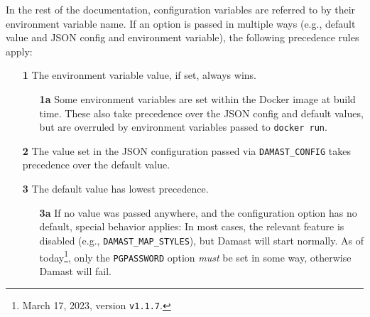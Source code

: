 In the rest of the documentation, configuration variables are referred to by their environment variable name.
If an option is passed in multiple ways (e.g., default value and JSON config and environment variable), the following precedence rules apply:

\begin{itemize}
  \item[\bfseries 1] The environment variable value, if set, always wins.
    \begin{itemize}
      \item[\bfseries 1a] Some environment variables are set within the Docker image at build time.
        These also take precedence over the JSON config and default values, but are overruled by environment variables passed to \verb!docker run!.
        \end{itemize}
  \item[\bfseries 2] The value set in the JSON configuration passed via \verb!DAMAST_CONFIG! takes precedence over the default value.
  \item[\bfseries 3] The default value has lowest precedence.
    \begin{itemize}
      \item[\bfseries 3a] If no value was passed anywhere, and the configuration option has no default, special behavior applies:
        In most cases, the relevant feature is disabled (e.g., \verb!DAMAST_MAP_STYLES!), but Damast will start normally.
        As of today\footnote{March 17, 2023, version \texttt{v1.1.7}.}, only the \verb!PGPASSWORD! option \emph{must} be set in some way, otherwise Damast will fail.
    \end{itemize}
\end{itemize}


\newcommand\configentry[4]{%
    \parbox[t][][t]{7cm}{%
      \texttt{#1} \\
      \ifthenelse{\equal{#2}{}}{---}{\texttt{#2}} \\
      \ifthenelse{\equal{#3}{}}{\emph{no value}}{\texttt{#3}} \vspace{4pt}%
      } & \parbox[t][][t]{9.5cm}{%
        #4 \vspace{4pt}%
      }}

